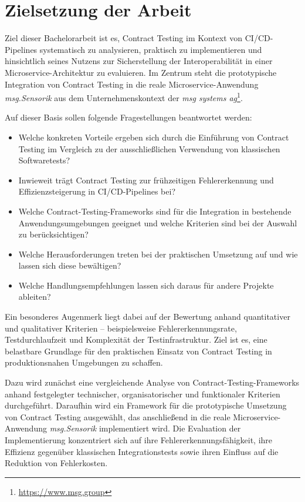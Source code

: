 \section{Zielsetzung der Arbeit}\label{sec:intro_objective}

Ziel dieser Bachelorarbeit ist es, Contract Testing im Kontext von \gls{CI}/\gls{CD}-\glspl{Pipeline} systematisch zu analysieren, praktisch zu implementieren und hinsichtlich seines Nutzens zur Sicherstellung der Interoperabilität in einer Microservice-Architektur zu evaluieren.
Im Zentrum steht die prototypische Integration von Contract Testing in die reale Microservice-Anwendung \textit{msg.Sensorik} aus dem Unternehmenskontext der \textit{msg systems ag}\footnote{\url{https://www.msg.group}}.

Auf dieser Basis sollen folgende Fragestellungen beantwortet werden:

\begin{itemize}
\item Welche konkreten Vorteile ergeben sich durch die Einführung von Contract Testing im Vergleich zu der ausschließlichen Verwendung von klassischen Softwaretests?
\item Inwieweit trägt Contract Testing zur frühzeitigen Fehlererkennung und Effizienzsteigerung in \gls{CI}/\gls{CD}-\glspl{Pipeline} bei?
\item Welche Contract-Testing-Frameworks sind für die Integration in bestehende Anwendungsumgebungen geeignet und welche Kriterien sind bei der Auswahl zu berücksichtigen?
\item Welche Herausforderungen treten bei der praktischen Umsetzung auf und wie lassen sich diese bewältigen?
\item Welche Handlungsempfehlungen lassen sich daraus für andere Projekte ableiten?
\end{itemize}

Ein besonderes Augenmerk liegt dabei auf der Bewertung anhand quantitativer und qualitativer Kriterien – beispielsweise Fehlererkennungsrate, Testdurchlaufzeit und Komplexität der Testinfrastruktur.
Ziel ist es, eine belastbare Grundlage für den praktischen Einsatz von Contract Testing in produktionsnahen Umgebungen zu schaffen.

Dazu wird zunächst eine vergleichende Analyse von Contract-\-Testing-\-Frame\-works anhand festgelegter technischer, organisatorischer und funktionaler Kriterien durchgeführt.
Daraufhin wird ein Framework für die prototypische Umsetzung von Contract Testing ausgewählt, das anschließend in die reale Microservice-Anwendung \textit{msg.Sensorik} implementiert wird.
Die Evaluation der Implementierung konzentriert sich auf ihre Fehlererkennungsfähigkeit, ihre Effizienz gegenüber klassischen Integrationstests sowie ihren Einfluss auf die Reduktion von Fehlerkosten.

